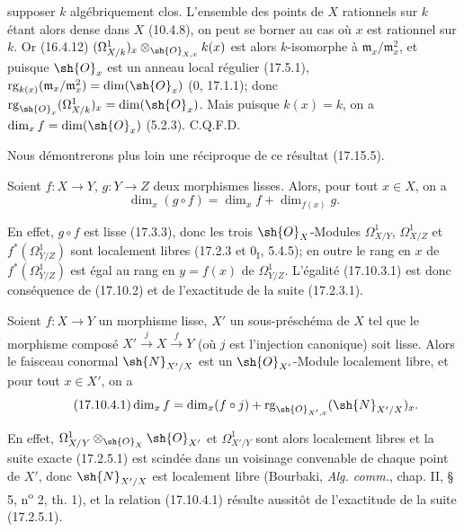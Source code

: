 
supposer $k$ algébriquement clos. L'ensemble des points de $X$ rationnels sur $k$ étant alors dense dans $X$ (10.4.8), on peut se borner au cas où $x$ est rationnel sur $k$. Or (16.4.12) $(\Omega^1_{X/k})_x\otimes_{\sh{O}_{X,x}}k(x)$ est alors $k$-isomorphe à $\mathfrak m_x/\mathfrak m_x^2$, et puisque $\sh{O}_x$ est un anneau local régulier (17.5.1), $\operatorname{rg}_{k(x)}(\mathfrak m_x/\mathfrak m_x^2)=\dim(\sh{O}_x)$ (0, 17.1.1); donc $\operatorname{rg}_{\sh{O}_x}(\Omega^1_{X/k})_x=\dim(\sh{O}_x)$. Mais puisque $k(x)=k$, on a $\dim_x f=\dim(\sh{O}_x)$ (5.2.3). C.Q.F.D.

Nous démontrerons plus loin une réciproque de ce résultat (17.15.5).

\begin{corollary}[17.10.3]
\label{IV.17.10.3}
Soient $f:X\to Y$, $g:Y\to Z$ deux morphismes lisses. Alors, pour tout $x\in X$, on a
\begin{equation}
\label{IV.17.10.3.1}
\tag{17.10.3.1}
\dim_x(g\circ f)=\dim_x f+\dim_{f(x)}g.
\end{equation}
\end{corollary}

En effet, $g\circ f$ est lisse (17.3.3), donc les trois $\sh{O}_X$-Modules $\Omega^1_{X/Y}$, $\Omega^1_{X/Z}$ et $f^*(\Omega^1_{Y/Z})$ sont localement libres (17.2.3 et $0_{\mathrm I}$, 5.4.5); en outre le rang en $x$ de $f^*(\Omega^1_{Y/Z})$ est égal au rang en $y=f(x)$ de $\Omega^1_{Y/Z}$. L'égalité (17.10.3.1) est donc conséquence de (17.10.2) et de l'exactitude de la suite (17.2.3.1).

\begin{corollary}[17.10.4]
\label{IV.17.10.4}
Soient $f:X\to Y$ un morphisme lisse, $X'$ un sous-préschéma de $X$ tel que le morphisme composé $X'\xrightarrow{j}X\xrightarrow{f}Y$ (où $j$ est l'injection canonique) soit lisse. Alors le faisceau conormal $\sh{N}_{X'/X}$ est un $\sh{O}_{X'}$-Module localement libre, et pour tout $x\in X'$, on a
\begin{equation}
\label{IV.17.10.4.1}
\tag{17.10.4.1}
\dim_x f=\dim_x(f\circ j)+\operatorname{rg}_{\sh{O}_{X',x}}(\sh{N}_{X'/X})_x.
\end{equation}
\end{corollary}

En effet, $\Omega^1_{X/Y}\otimes_{\sh{O}_X}\sh{O}_{X'}$ et $\Omega^1_{X'/Y}$ sont alors localement libres et la suite exacte (17.2.5.1) est scindée dans un voisinage convenable de chaque point de $X'$, donc $\sh{N}_{X'/X}$ est localement libre (Bourbaki, \emph{Alg. comm.}, chap. II, § 5, n\textsuperscript{o} 2, th. 1), et la relation (17.10.4.1) résulte aussitôt de l'exactitude de la suite (17.2.5.1).

